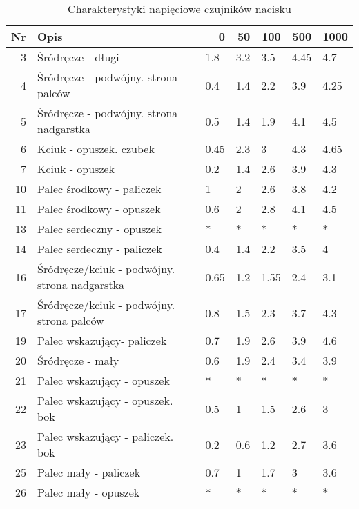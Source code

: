 \documentclass[10pt, a4paper]{article}
\begin{document}
\begin{table}[htbp]
  \centering
  \caption{Charakterystyki napięciowe czujników nacisku}
    \begin{tabular}{rllllll}
    \toprule
    \multicolumn{1}{l}{Nr} & Opis  & \multicolumn{1}{r}{0} & \multicolumn{1}{r}{50} & \multicolumn{1}{r}{100} & \multicolumn{1}{r}{500} & \multicolumn{1}{r}{1000} \\
    \midrule
    3     & Śródręcze - długi & 1.8   & 3.2   & 3.5   & 4.45  & 4.7 \\
    4     & Śródręcze - podwójny. strona palców & 0.4   & 1.4   & 2.2   & 3.9   & 4.25 \\
    5     & Śródręcze - podwójny. strona nadgarstka & 0.5   & 1.4   & 1.9   & 4.1   & 4.5 \\
    6     & Kciuk - opuszek. czubek & 0.45  & 2.3   & 3 & 4.3   & 4.65 \\
    7     & Kciuk - opuszek & 0.2   & 1.4   & 2.6   & 3.9   & 4.3 \\
    10    & Palec środkowy - paliczek & 1 & 2 & 2.6   & 3.8   & 4.2 \\
    11    & Palec środkowy - opuszek & 0.6   & 2 & 2.8   & 4.1   & 4.5 \\
    13    & Palec serdeczny - opuszek & $*$ & $*$ & $*$ & $*$ & $*$ \\
    14    & Palec serdeczny - paliczek & 0.4   & 1.4   & 2.2   & 3.5   & 4 \\
    16    & Śródręcze/kciuk - podwójny. strona nadgarstka & 0.65  & 1.2   & 1.55  & 2.4   & 3.1 \\
    17    & Śródręcze/kciuk - podwójny. strona palców & 0.8   & 1.5   & 2.3   & 3.7   & 4.3 \\
    19    & Palec wskazujący- paliczek & 0.7   & 1.9   & 2.6   & 3.9   & 4.6 \\
    20    & Śródręcze - mały & 0.6   & 1.9   & 2.4   & 3.4   & 3.9 \\
    21    & Palec wskazujący - opuszek & $*$ & $*$ & $*$ & $*$ & $*$ \\
    22    & Palec wskazujący - opuszek. bok & 0.5   & 1 & 1.5   & 2.6   & 3 \\
    23    & Palec wskazujący - paliczek. bok & 0.2   & 0.6   & 1.2   & 2.7   & 3.6 \\
    25    & Palec mały - paliczek & 0.7   & 1 & 1.7   & 3 & 3.6 \\
    26    & Palec mały - opuszek & $*$ & $*$ & $*$ & $*$ & $*$ \\
    \bottomrule
    \end{tabular}%
  \label{tab:nap_nacisk}%
\end{table}%
\end{document}
